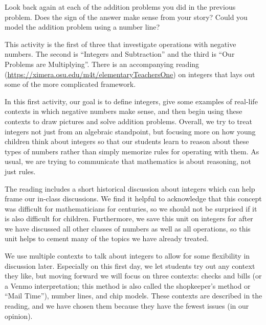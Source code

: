 \documentclass[ nooutcomes,noauthor]{ximera}
\begin{document}
\begin{problem}
Look back again at each of the addition problems you did in the previous problem.  Does the sign of the answer make sense from your story?  Could you model the addition problem using a number line?

\end{problem}


\newpage
\begin{instructorNotes}
This activity is the first of three that investigate operations with negative numbers.  The second is ``Integers and Subtraction'' and the third is ``Our Problems are Multiplying''.  There is an accompanying reading (\url{https://ximera.osu.edu/m4t/elementaryTeachersOne}) on integers that lays out some of the more complicated framework.

In this first activity, our goal is to define integers, give some examples of real-life contexts in which negative numbers make sense, and then begin using these contexts to draw pictures and solve addition problems.  Overall, we try to treat integers not just from an algebraic standpoint, but focusing more on how young children think about integers so that our students learn to reason about these types of numbers rather than simply memorize rules for operating with them.  As usual, we are trying to communicate that mathematics is about reasoning, not just rules.

The reading includes a short historical discussion about integers which can help frame our in-class discussions.  We find it helpful to acknowledge that this concept was difficult for mathematicians for centuries, so we should not be surprised if it is also difficult for children.  Furthermore, we save this unit on integers for after we have discussed all other classes of numbers as well as all operations, so this unit helps to cement many of the topics we have already treated.

We use multiple contexts to talk about integers to allow for some flexibility in discussion later.  Especially on this first day, we let students try out any context they like, but moving forward we will focus on three contexts: checks and bills (or a Venmo interpretation; this method is also called the shopkeeper's method or ``Mail Time''), number lines, and chip models.  These contexts are described in the reading, and we have chosen them because they have the fewest issues (in our opinion).


\end{instructorNotes}
\end{document}
